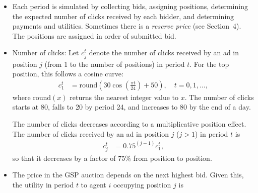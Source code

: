 \documentclass[11pt]{article}
\begin{document}
\begin{description}
\begin{itemize}
\item Each period is simulated by collecting bids, assigning positions,
  determining the expected number of clicks received by each bidder,
  and determining payments and utilities.  Sometimes there is a {\em
    reserve price} (see Section~4). The positions are assigned
in order of submitted bid.
%
\item Number of clicks: Let $c_j^t$ denote the number of clicks
  received by an ad in position $j$ (from 1 to the number of
  positions) in period $t$. For the top position, this
  follows a cosine curve:
%
\begin{align}
 c_1^t &= \mbox{round}(30 \cos(\frac{\pi t}{24}) + 50),
\quad t = 0, 1, \ldots,
\end{align}
%
where $\mbox{round}(x)$ returns the nearest integer value to $x$.
The number of clicks starts at 80, falls to 20 by period 24,
and  increases  to 80 by the end of a day.

The number of clicks decreases according to a multiplicative
position effect. The number of clicks received by an ad in
position $j$ ($j>1$) in period $t$ is
%
\begin{align}
c_j^t &= 0.75^{(j-1)}c_1^t,
\end{align}
%
so that it decreases by a factor of 75\% from  position to position.
%
\item The price in the GSP auction depends on the next highest bid.
Given this, the utility in period $t$ to
agent $i$ occupying position $j$
is


\end{itemize}
\end{description}
\end{document}
